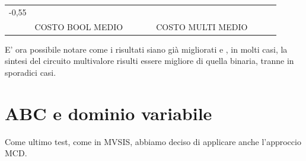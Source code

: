\documentclass[italian,]{book}
\begin{document}
\begin{longtable}[]{@{}lllllllll@{}}
\begin{minipage}[t]{0.07\columnwidth}
-0,55\strut
\end{minipage}\tabularnewline
\begin{minipage}[t]{0.07\columnwidth}\raggedright
\strut
\end{minipage} & \begin{minipage}[t]{0.11\columnwidth}\raggedright
COSTO BOOL MEDIO\strut
\end{minipage} & \begin{minipage}[t]{0.08\columnwidth}\raggedright
\strut
\end{minipage} & \begin{minipage}[t]{0.07\columnwidth}\raggedright
\strut
\end{minipage} & \begin{minipage}[t]{0.09\columnwidth}\raggedright
\strut
\end{minipage} & \begin{minipage}[t]{0.12\columnwidth}\raggedright
COSTO MULTI MEDIO\strut
\end{minipage} & \begin{minipage}[t]{0.08\columnwidth}\raggedright
\strut
\end{minipage} & \begin{minipage}[t]{0.07\columnwidth}\raggedright
\strut
\end{minipage} & \begin{minipage}[t]{0.07\columnwidth}\raggedright
\strut
\end{minipage}\tabularnewline
\bottomrule
\end{longtable}

E' ora possibile notare come i risultati siano già migliorati e , in molti casi, la sintesi del circuito multivalore risulti essere migliore di quella binaria, tranne in sporadici casi.

\hypertarget{abc-e-dominio-variabile}{%
\section{ABC e dominio variabile}\label{abc-e-dominio-variabile}}

Come ultimo test, come in MVSIS, abbiamo deciso di applicare anche l'approccio MCD.
\end{document}
